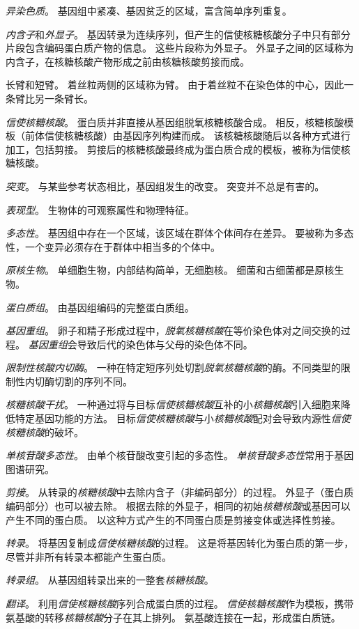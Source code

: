 \textit{异染色质}。
基因组中紧凑、基因贫乏的区域，富含简单序列重复。


\textit{内含子}和\textit{外显子}。
基因转录为连续序列，但产生的信使核糖核酸分子中只有部分片段包含编码蛋白质产物的信息。
这些片段称为外显子。
外显子之间的区域称为内含子，在核糖核酸产物形成之前由核糖核酸剪接而成。


长臂和短臂。
着丝粒两侧的区域称为臂。
由于着丝粒不在染色体的中心，因此一条臂比另一条臂长。


\textit{信使核糖核酸}。
蛋白质并非直接从基因组脱氧核糖核酸合成。
相反，核糖核酸模板（前体信使核糖核酸）由基因序列构建而成。
该核糖核酸随后以各种方式进行加工，包括剪接。
剪接后的核糖核酸最终成为蛋白质合成的模板，被称为信使核糖核酸。


\textit{突变}。
与某些参考状态相比，基因组发生的改变。
突变并不总是有害的。


\textit{表现型}。
生物体的可观察属性和物理特征。


\textit{多态性}。
基因组中存在一个区域，该区域在群体个体间存在差异。
要被称为多态性，一个变异必须存在于群体中相当多的个体中。


\textit{原核生物}。
单细胞生物，内部结构简单，无细胞核。
细菌和古细菌都是原核生物。


\textit{蛋白质组}。
由基因组编码的完整蛋白质组。


\textit{基因重组}。
卵子和精子形成过程中，\textit{脱氧核糖核酸}在等价染色体对之间交换的过程。
\textit{基因重组}会导致后代的染色体与父母的染色体不同。


\textit{限制性核酸内切酶}。
一种在特定短序列处切割\textit{脱氧核糖核酸}的酶。不同类型的限制性内切酶切割的序列不同。


\textit{核糖核酸干扰}。
一种通过将与目标\textit{信使核糖核酸}互补的小\textit{核糖核酸}引入细胞来降低特定基因功能的方法。
目标\textit{信使核糖核酸}与小\textit{核糖核酸}配对会导致内源性\textit{信使核糖核酸}的破坏。


\textit{单核苷酸多态性}。
由单个核苷酸改变引起的多态性。
\textit{单核苷酸多态性}常用于基因图谱研究。


\textit{剪接}。
从转录的\textit{核糖核酸}中去除内含子（非编码部分）的过程。
外显子（蛋白质编码部分）也可以被去除。
根据去除的外显子，相同的初始\textit{核糖核酸}或基因可以产生不同的蛋白质。
以这种方式产生的不同蛋白质是剪接变体或选择性剪接。


\textit{转录}。
将基因复制成\textit{信使核糖核酸}的过程。
这是将基因转化为蛋白质的第一步，尽管并非所有转录本都能产生蛋白质。


\textit{转录组}。
从基因组转录出来的一整套\textit{核糖核酸}。


\textit{翻译}。
利用\textit{信使核糖核酸}序列合成蛋白质的过程。
\textit{信使核糖核酸}作为模板，携带氨基酸的转移\textit{核糖核酸}分子在其上排列。
氨基酸连接在一起，形成蛋白质链。







